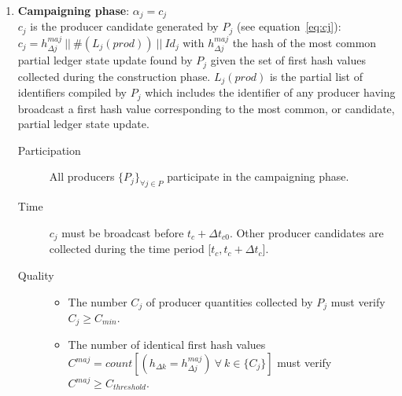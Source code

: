 \begin{enumerate}
\item \textbf{Campaigning phase}: $\alpha_j = c_j$\\
$c_j$ is the producer candidate generated by $P_j$ (see equation~\ref{eq:cj}):\\
$c_j = h^{maj}_{\Delta j}~||~\#(L_j(prod))~||~Id_j$ with $h^{maj}_{\Delta j}$ the hash of the most common partial ledger state update found by $P_j$ given the set of first hash values collected during the construction phase. $L_j(prod)$ is the partial list of identifiers compiled by $P_j$ which includes the identifier of any producer having broadcast a first hash value corresponding to the most common, or candidate, partial ledger state update.
\begin{description}
\item[Participation] All producers $\{P_j\}_{\forall j\in P}$ participate in the campaigning phase. 
\item[Time] $c_j$ must be broadcast before $t_c + \Delta t_{c0}$. Other producer candidates are collected during the time period [$t_c, t_c + \Delta t_{c}$].
\item[Quality] 
\begin{itemize}
\item The number $C_j$ of producer quantities collected by $P_j$ must verify $C_j \geq C_{min}$.
\item The number of identical first hash values $C^{maj} = count[(h_{\Delta k} = h^{maj}_{\Delta j})~\forall~k\in\{C_j\}]$ must verify $C^{maj} \geq C_{threshold}$.
\end{itemize}
\end{description}


\end{enumerate}
